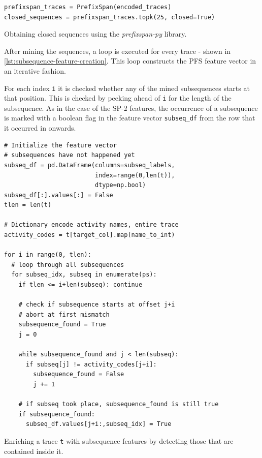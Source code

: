 \begin{listing}[ht]
\begin{verbatim}
prefixspan_traces = PrefixSpan(encoded_traces)
closed_sequences = prefixspan_traces.topk(25, closed=True)
\end{verbatim}
\caption{Obtaining closed sequences using the \textit{prefixspan-py} library.}
\label{lst:pfs-mining}
\end{listing}

After mining the sequences, a loop is executed for every trace - shown in \autoref{lst:subsequence-feature-creation}. This loop constructs the PFS feature vector in an iterative fashion.

For each index \verb=i= it is checked whether any of the mined subsequences starts at that position. This is checked by peeking ahead of \verb=i= for the length of the subsequence. As in the case of the SP-2 features, the occurrence of a subsequence is marked with a boolean flag in the feature vector \verb=subseq_df= from the row that it occurred in onwards.

\begin{listing}[ht]
\begin{verbatim}
# Initialize the feature vector
# subsequences have not happened yet
subseq_df = pd.DataFrame(columns=subseq_labels,
                         index=range(0,len(t)),
                         dtype=np.bool)
subseq_df[:].values[:] = False
tlen = len(t)

# Dictionary encode activity names, entire trace
activity_codes = t[target_col].map(name_to_int)

for i in range(0, tlen):
  # loop through all subsequences
  for subseq_idx, subseq in enumerate(ps):
    if tlen <= i+len(subseq): continue

    # check if subsequence starts at offset j+i
    # abort at first mismatch
    subsequence_found = True
    j = 0

    while subsequence_found and j < len(subseq):
      if subseq[j] != activity_codes[j+i]:
        subsequence_found = False
        j += 1

    # if subseq took place, subsequence_found is still true
    if subsequence_found:
      subseq_df.values[j+i:,subseq_idx] = True
\end{verbatim}
\caption{Enriching a trace \texttt{t} with subsequence features by detecting those that are contained inside it.}
\label{lst:subsequence-feature-creation}
\end{listing}

